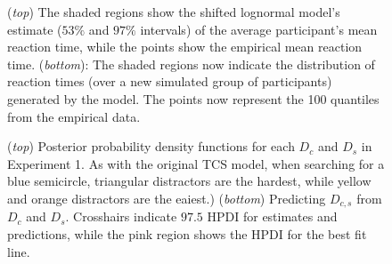 \documentclass[preprint,12pt,authoryear]{elsarticle}
\begin{document}
\begin{figure}[ht]
\centering
{}
\caption{(\textit{top}) The shaded regions show the shifted lognormal model's estimate ($53\%$ and $97\%$ intervals) of the average participant's mean reaction time, while the points show the empirical mean reaction time. (\textit{bottom}): The shaded regions now indicate the distribution of reaction times (over a new simulated group of participants) generated by the model. The points now represent the 100 quantiles from the empirical data.}
\label{fig:buetti2019_a1}
\end{figure}

\begin{figure}[ht]
\centering
{}
\caption{(\textit{top}) Posterior probability density functions for each $D_c$ and $D_s$ in Experiment 1. As with the original TCS model, when searching for a blue semicircle, triangular distractors are the hardest, while yellow and orange distractors are the eaiest.) (\textit{bottom}) Predicting $D_{c,s}$ from $D_c$ and $D_s$. Crosshairs indicate $97.5$ HPDI for estimates and predictions, while the pink region shows the HPDI for the best fit line. }
\label{fig:buetti2019_D}
\end{figure}
\end{document}
